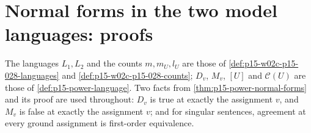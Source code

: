 \section{Normal forms in the two model languages: proofs}
\label{sec:annex-p15-w02c-p15-028-model-languages}

The languages \(L_1,L_2\) and the counts \(m,m_U,l_U\) are those of
\cref{def:p15-w02c-p15-028-languages} and
\cref{def:p15-w02c-p15-028-counts}; \(D_v\), \(M_v\), \([U]\) and
\(\mathcal C(U)\) are those of \cref{def:p15-power-language}. Two facts
from \cref{thm:p15-power-normal-forms} and its proof are used
throughout: \(D_v\) is true at exactly the assignment \(v\), and
\(M_v\) is false at exactly the assignment \(v\); and for singular
sentences, agreement at every ground assignment is first-order
equivalence.

